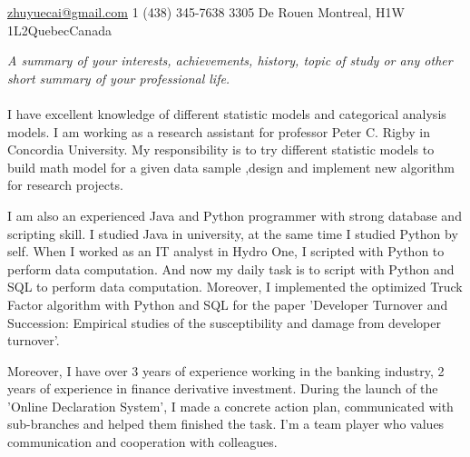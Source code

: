 \documentclass[10pt,a4paper]{article} %
\begin{document}
 



\noindent\href{mailto:zhuyuecai@gmail.com}{zhuyuecai@gmail.com}\bull %
\textsmaller{+}1 (438) 345-7638\bull 
3305 De Rouen \bull Montreal, H1W 1L2\bull Quebec\bull Canada %

\spacedhrule{0.9em}{-0.4em} %



\vspace{-1.3em} %

\begin{multicols}{2}  %
\noindent \textit{A summary of your interests, achievements, history, topic of study or any other short summary of your professional life.}\\\\
I have excellent knowledge of different statistic models and categorical analysis models. I am working as a research assistant for professor Peter C. Rigby in Concordia University. My responsibility is to try different statistic models to build math model for a given data sample ,design and implement new algorithm for research projects.  

I am also an experienced Java and Python programmer with strong database and scripting skill.  I studied Java in university, at the same time I studied Python by self. When I worked as an IT analyst in Hydro One, I scripted with Python to perform data computation. And now my daily task is to script with Python and SQL to perform data computation. Moreover, I implemented the optimized Truck Factor algorithm with Python and SQL for the paper 'Developer Turnover and Succession: Empirical studies of the susceptibility and damage from developer turnover'. 

Moreover, I have over 3 years of experience working in the banking industry, 2 years of experience in finance derivative investment. During the launch of the 'Online Declaration System', I made a concrete action plan, communicated with sub-branches and helped them finished the task. I'm a team player who values communication and cooperation with colleagues. 
\end{multicols}
\end{document}
